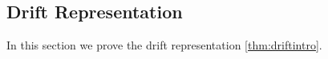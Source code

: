 \documentclass[reqno,draft]{amsart}
\numberwithin{equation}{section}
\theoremstyle{plain}
\newtheorem{lemma}[theorem]{Lemma}
\theoremstyle{remark}
\newcommand*\diff{\mathop{}\!\mathrm{d}}
\DeclareMathOperator{\pr}{pr}
\DeclareMathOperator{\dcb}{dec}
\DeclareMathOperator{\dct}{tm}
\newcommand{\fsp}{f_\mathrm{sp}}
\begin{document}

\subsection{Drift Representation}\label{sec:prfdrift}
In this section we prove the drift representation \cref{thm:driftintro}.
\end{document}
